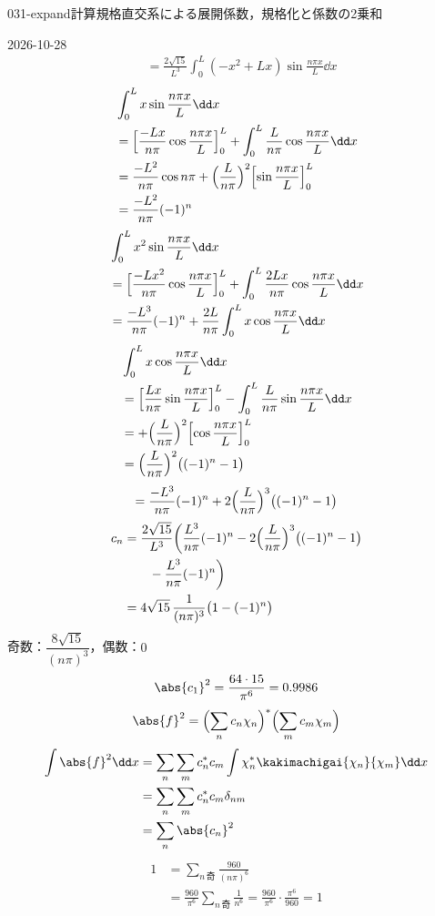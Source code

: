 \documentclass[uplatex,dvipdfmx,a4paper,11pt]{jsarticle}
\begin{document}
\begin{mondai}{031-expand}{計算}{規格直交系による展開係数，規格化と係数の2乗和}
\begin{kotaeutsushi}{2026-10-28}
\begin{align*}
&=\frac{2\sqrt{15}}{L^{3}}\int_{0}^{L}(-x^{2}+Lx)\sin\frac{n\pi x}{L}\dd x
\end{align*}
\begin{align*}
&\int_{0}^{L}x\sin\frac{n\pi x}{L}\dd x\\
&=\Bigl[\frac{-Lx}{n\pi}\cos\frac{n\pi x}{L}\Bigr]_{0}^{L}+\int_{0}^{L}\frac{L}{n\pi}\cos\frac{n\pi x}{L}\dd x\\
&=\frac{-L^{2}}{n\pi}\cos n\pi+\Bigl(\frac{L}{n\pi}\Bigr)^{2}\Bigl[\sin\frac{n\pi x}{L}\Bigr]_{0}^{L}\\
&=\frac{-L^{2}}{n\pi}(-1)^{n}
\end{align*}
\begin{align*}
&\int_{0}^{L}x^{2}\sin\frac{n\pi x}{L}\dd x\\
&=\Bigl[\frac{-Lx^{2}}{n\pi}\cos\frac{n\pi x}{L}\Bigr]_{0}^{L}+\int_{0}^{L}\frac{2Lx}{n\pi}\cos\frac{n\pi x}{L}\dd x\\
&=\frac{-L^{3}}{n\pi}(-1)^{n}+\frac{2L}{n\pi}\int_{0}^{L}x\cos\frac{n\pi x}{L}\dd x
\end{align*}
\begin{align*}
&\int_{0}^{L}x\cos\frac{n\pi x}{L}\dd x\\
&=\Bigl[\frac{Lx}{n\pi}\sin\frac{n\pi x}{L}\Bigr]_{0}^{L}-\int_{0}^{L}\frac{L}{n\pi}\sin\frac{n\pi x}{L}\dd x\\
&=+\Bigl(\frac{L}{n\pi}\Bigr)^{2}\Bigl[\cos\frac{n\pi x}{L}\Bigr]_{0}^{L}\\
&=\Bigl(\frac{L}{n\pi}\Bigr)^{2}\bigl((-1)^{n}-1\bigr)
\end{align*}
\[ =\frac{-L^{3}}{n\pi}(-1)^{n}+2\Bigl(\frac{L}{n\pi}\Bigr)^{3}\bigl((-1)^{n}-1\bigr) \]
\begin{align*}
c_{n}&=\frac{2\sqrt{15}}{L^{3}}\biggl(\frac{L^{3}}{n\pi}(-1)^{n}-2\Bigl(\frac{L}{n\pi}\Bigr)^{3}\bigl((-1)^{n}-1\bigr)\\
&\qquad-\frac{L^{3}}{n\pi}(-1)^{n}\biggr)\\
&=4\sqrt{15}\,\frac{1}{(n\pi)^{3}}\bigl(1-(-1)^{n}\bigr)
\end{align*}
奇数：$\dfrac{8\sqrt{15}}{(n\pi)^{3}}$，偶数：$0$
\[ \abs{c_{1}}^{2}=\frac{64\cdot15}{\pi^{6}}=0.9986 \]
\[ \abs{f}^{2}=\Bigl(\sum_{n}c_{n}\chi_{n}\Bigr)^{*}\Bigl(\sum_{m}c_{m}\chi_{m}\Bigr) \]
\begin{align*}
\int\abs{f}^{2}\dd x&=\sum_{n}\sum_{m}c_{n}^{*}c_{m}\int\chi_{n}^{*}\kakimachigai{\chi_{n}}{\chi_{m}}\dd x\\
&=\sum_{n}\sum_{m}c_{n}^{*}c_{m}\delta_{nm}\\
&=\sum_{n}\abs{c_{n}}^{2}
\end{align*}
\begin{align*}
1&=\sum_{n\,\text{奇}}\frac{960}{(n\pi)^{6}}\\
&=\frac{960}{\pi^{6}}\sum_{n\,\text{奇}}\frac{1}{n^{6}}=\frac{960}{\pi^{6}}\cdot\frac{\pi^{6}}{960}=1
\end{align*}
\end{kotaeutsushi}
\end{mondai}
\end{document}
